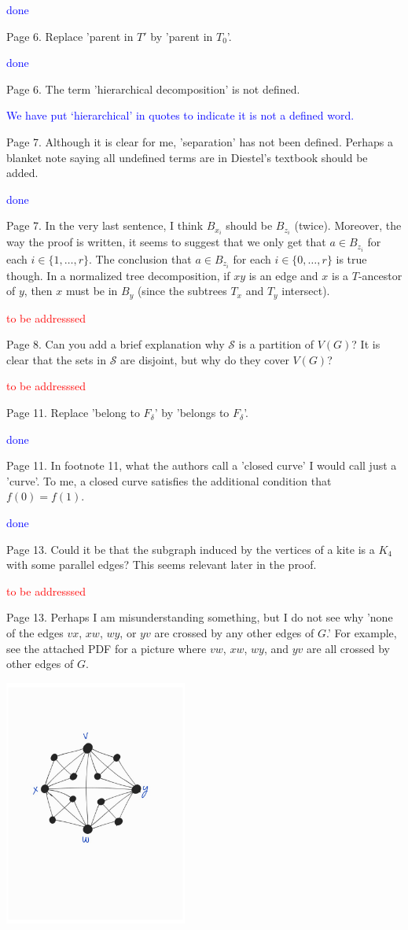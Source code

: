 \documentclass[12pt]{article}
\newcommand{\done}{\textcolor{blue}{done}}
\newcommand{\tba}{\textcolor{red}{to be addresssed}}
\begin{document}
\done

Page 6. Replace 'parent in $T'$ by 'parent in $T_0$'.

\done

Page 6. The term 'hierarchical decomposition' is not defined.

\textcolor{blue}{We have put `hierarchical' in quotes to indicate it is not a defined word.}

Page 7. Although it is clear for me, 'separation' has not been
defined.  Perhaps a blanket note saying all undefined terms are in
Diestel's textbook should be added.

\done

Page 7.  In the very last sentence, I think $B_{x_i}$ should be $B_{z_i}$
(twice).  Moreover, the way the proof is written, it seems to suggest
that we only get that $a \in B_{z_i}$ for each $i \in \{1, \dots, r\}$.
The conclusion that $a \in B_{z_i}$ for each $i \in \{0, \dots, r\}$ is
true though.  In a normalized tree decomposition, if $xy$ is an edge and
$x$ is a $T$-ancestor of $y$, then $x$ must be in $B_y$ (since the subtrees $T_x$
and $T_y$ intersect).

\tba

Page 8.  Can you add a brief explanation why $\mathcal{S}$ is a
partition of $V(G)$?  It is clear that the sets in $\mathcal{S}$ are
disjoint, but why do they cover $V(G)$?

\tba

Page 11. Replace 'belong to $F_\delta$' by 'belongs to $F_\delta$'.

\done

Page 11. In footnote 11, what the authors call a 'closed curve' I
would call just a 'curve'.  To me, a closed curve satisfies the
additional condition that $f(0)=f(1)$.

\done

Page 13. Could it be that the subgraph induced by the vertices of a
kite is a $K_4$ with some parallel edges?  This seems relevant later in
the proof.

\tba

Page 13. Perhaps I am misunderstanding something, but I do not see why
'none of the edges $vx$, $xw$, $wy$, or $yv$ are crossed by any other edges of
$G$.'  For example, see the attached PDF for a picture where $vw$, $xw$, $wy$,
and $yv$ are all crossed by other edges of $G$.

\includegraphics[width=60mm]{kite}
\end{document}
